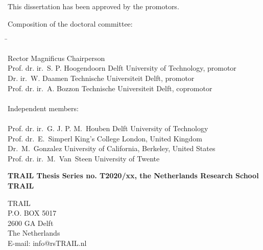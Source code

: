 \begin{small}

\noindent This dissertation has been approved by the promotors.\\
\bigskip{}

\noindent Composition of the doctoral committee:
\smallskip{}

\noindent \begin{flushleft}\begin{tabbing}
\hspace*{70mm}\=\kill

Rector Magnificus \> Chairperson\\
Prof. dr. ir.\ S. P. Hoogendoorn \> Delft University of Technology, promotor\\
Dr. ir.\ W. Daamen \> Technische Universiteit Delft, promotor\\
Prof. dr. ir.\ A. Bozzon \> Technische Universiteit Delft, copromotor\\
\bigskip{}\\

\noindent Independent members:\\
\\

Prof. dr. ir.\ G. J. P. M.\ Houben \> Delft University of Technology\\
Prof. dr.\ E.\ Simperl \> King's College London, United Kingdom\\
Dr.\ M.\ Gonzalez \> University of California, Berkeley, United States\\
Prof. dr. ir.\ M.\ Van\ Steen \> University of Twente\\
\end{tabbing}\end{flushleft}

\vspace*{\fill}


\bigskip{}
\noindent\textbf{TRAIL Thesis Series no. T2020/xx, the Netherlands Research School TRAIL}\\
\smallskip{}

\noindent TRAIL\\
P.O. BOX 5017\\
2600 GA Delft\\
The Netherlands\\
E-mail: info@rsTRAIL.nl\\
\bigskip{}


\end{small}
